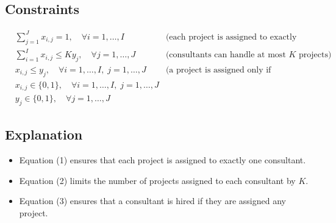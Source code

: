 \documentclass{article}
\begin{document}
\subsection*{Constraints}
\begin{align}
    & \sum_{j=1}^{J} x_{i,j} = 1, \quad \forall i = 1, \ldots, I \quad &\text{(each project is assigned to exactly one consultant)} \\
    & \sum_{i=1}^{I} x_{i,j} \leq K y_j, \quad \forall j = 1, \ldots, J \quad &\text{(consultants can handle at most } K \text{ projects)} \\
    & x_{i,j} \leq y_j, \quad \forall i = 1, \ldots, I, \; j = 1, \ldots, J \quad &\text{(a project is assigned only if consultant is hired)} \\
    & x_{i,j} \in \{0, 1\}, \quad \forall i = 1, \ldots, I, \; j = 1, \ldots, J \\
    & y_j \in \{0, 1\}, \quad \forall j = 1, \ldots, J
\end{align}

\subsection*{Explanation}
\begin{itemize}
    \item Equation (1) ensures that each project is assigned to exactly one consultant.
    \item Equation (2) limits the number of projects assigned to each consultant by \( K \).
    \item Equation (3) ensures that a consultant is hired if they are assigned any project.
\end{itemize}
\end{document}
